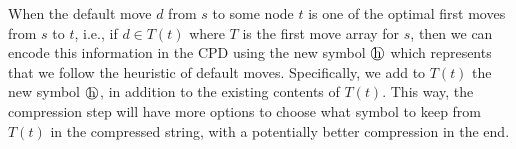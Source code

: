 
\ignore
{
When the default move $d$ from $s$ to
some node $t$ is one of the optimal first moves from $s$ to $t$,
i.e., if $d \in T(t)$ where $T$ is the first move array for $s$,
then we can encode this information in the CPD using the new symbol
$\heur$ which represents that we follow the heuristic of default moves.
Specifically, we add to $T(t)$ the new symbol $\heur$, in addition to the existing
contents of $T(t)$. This way, the compression step will have more options to 
choose what symbol to keep from $T(t)$ in the compressed string, with a potentially better compression in the end.
}

